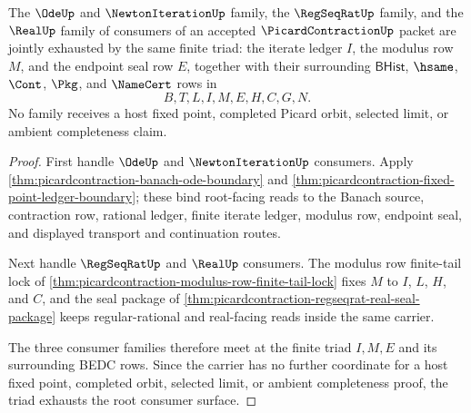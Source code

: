 \begin{theorem}
\label{thm:picardcontraction-root-consumer-triad-exhaustion}
The $\OdeUp$ and $\NewtonIterationUp$ family, the $\RegSeqRatUp$ family, and the $\RealUp$ family of consumers of an accepted $\PicardContractionUp$ packet are jointly exhausted by the same finite triad: the iterate ledger $I$, the modulus row $M$, and the endpoint seal row $E$, together with their surrounding $\mathsf{BHist}$, $\hsame$, $\Cont$, $\Pkg$, and $\NameCert$ rows in
$$
B,T,L,I,M,E,H,C,G,N.
$$
No family receives a host fixed point, completed Picard orbit, selected limit, or ambient completeness claim.
\end{theorem}
\begin{proof}
First handle $\OdeUp$ and $\NewtonIterationUp$ consumers. Apply \autoref{thm:picardcontraction-banach-ode-boundary} and \autoref{thm:picardcontraction-fixed-point-ledger-boundary}; these bind root-facing reads to the Banach source, contraction row, rational ledger, finite iterate ledger, modulus row, endpoint seal, and displayed transport and continuation routes.

Next handle $\RegSeqRatUp$ and $\RealUp$ consumers. The modulus row finite-tail lock of \autoref{thm:picardcontraction-modulus-row-finite-tail-lock} fixes $M$ to $I$, $L$, $H$, and $C$, and the seal package of \autoref{thm:picardcontraction-regseqrat-real-seal-package} keeps regular-rational and real-facing reads inside the same carrier.

The three consumer families therefore meet at the finite triad $I,M,E$ and its surrounding BEDC rows. Since the carrier has no further coordinate for a host fixed point, completed orbit, selected limit, or ambient completeness proof, the triad exhausts the root consumer surface.
\end{proof}

